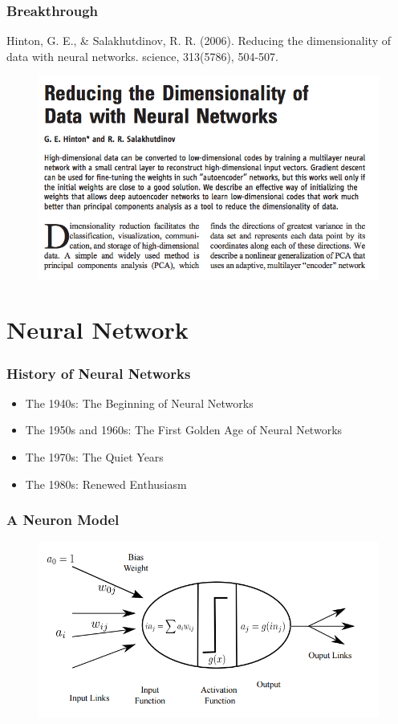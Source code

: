 \documentclass{beamer}
\begin{document}
\begin{frame}
	\frametitle{Breakthrough}
	{\small Hinton, G. E., \& Salakhutdinov, R. R. (2006). Reducing the dimensionality of data with neural networks. science, 313(5786), 504-507.}
	\begin{figure}
		\includegraphics[width=0.95\linewidth]{breakthrough}
	\end{figure}
\end{frame}

\section{Neural Network}

\begin{frame}
	\frametitle{History of Neural Networks}
\begin{itemize}
	\item The 1940s: The Beginning of Neural Networks
\item The 1950s and 1960s: The First Golden Age of
Neural Networks
\item The 1970s: The Quiet Years
\item The 1980s: Renewed Enthusiasm
\end{itemize}
\end{frame}

\begin{frame}
	\frametitle{A Neuron Model}
	\begin{figure}
		\includegraphics[width=\linewidth]{neuron_model.png}
	\end{figure}
\end{frame}
\end{document}
